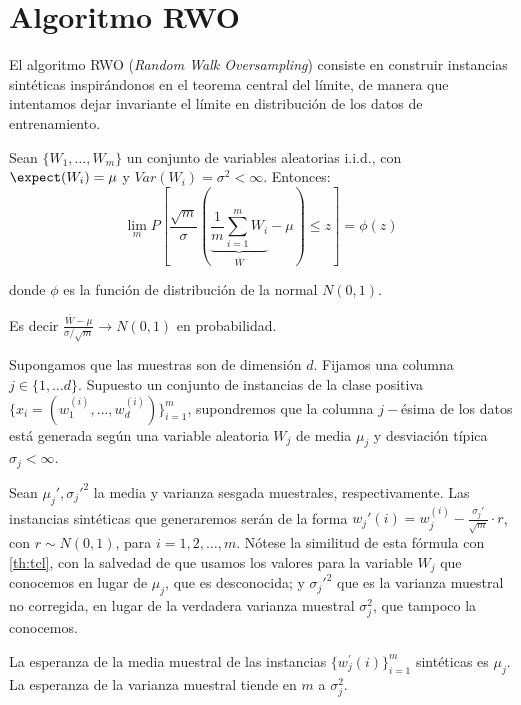 \section{Algoritmo RWO}
El algoritmo RWO (\textit{Random Walk Oversampling}) consiste en construir instancias sintéticas inspirándonos
en el teorema central del límite, de manera que intentamos dejar invariante el límite en distribución de los
datos de entrenamiento.

\begin{theorem}
 Sean $\{W_1, \ldots, W_m\}$ un conjunto de variables aleatorias i.i.d., con $\expect(W_i) = \mu$ y 
 $Var(W_i) = \sigma^2 < \infty$. Entonces: 
 \[
   \lim_{m} P\left[\frac{\sqrt{m}}{\sigma} \left(\underbrace{\frac{1}{m}\sum_{i=1}^m W_i}_{\overline{W}} - 
   \mu \right) \le z \right] = \phi(z)
 \]
 
 donde $\phi$ es la función de distribución de la normal $N(0,1)$.
 
 Es decir $\frac{\overline{W} - \mu}{\sigma/\sqrt{m}} \rightarrow N(0,1)$ en probabilidad.
 
 \label{th:tcl}
\end{theorem}

Supongamos que las muestras son de dimensión $d$. Fijamos una columna $j\in \{1, \ldots d\}$. Supuesto un
conjunto de instancias de la clase positiva $\{x_i=(w_1^{(i)}, \ldots, w_d^{(i)})\}_{i=1}^m$, supondremos que la
columna $j-$ésima de los datos está generada según una variable aleatoria $W_j$ de media $\mu_j$ y desviación
típica $\sigma_j < \infty$.

Sean $\mu_j', \sigma_j'^2$ la media y varianza sesgada muestrales, respectivamente. Las instancias sintéticas 
que generaremos serán de la forma $w_j'(i) = w_j^{(i)} - \frac{\sigma_j'}{\sqrt{m}} \cdot r$, con 
$r\sim N(0,1)$, para $i=1, 2, \ldots, m$. Nótese la similitud de esta fórmula con \ref{th:tcl}, con la salvedad
de que usamos los valores para la variable $W_j$ que conocemos en lugar de $\mu_j$, que es desconocida; y 
$\sigma_j'^2$ que es la varianza muestral no corregida, en lugar de la verdadera varianza muestral $\sigma_j^2$, 
que tampoco la conocemos.

\begin{theorem}
 La esperanza de la media muestral de las instancias $\{w_j^{'}(i)\}_{i=1}^m$ sintéticas es $\mu_j$. 
 La esperanza de la varianza muestral tiende en $m$ a $\sigma_j^2$.
 \label{th:asyn-guarantee}
\end{theorem}

